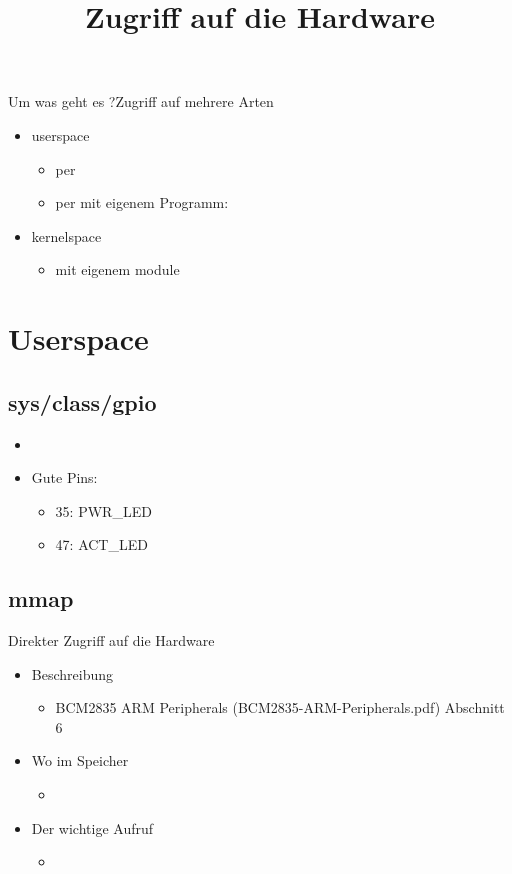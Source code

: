 \documentclass{beamer}
\begin{document}
\newcommand{\qemu}{{\em qemu}\xspace}
\newcommand{\busybox}{{\em busybox}\xspace}
\newcommand{\yocto}{{\em yocto}\xspace}
\title{Zugriff auf die Hardware}

\frame{\titlepage}

\begin{frame}{Um was geht es ?}{Zugriff auf mehrere Arten}
 \begin{itemize}
  \item userspace
  \begin{itemize}
   \item per 
   \item per  mit eigenem Programm: 
  \end{itemize}
  \item kernelspace
  \begin{itemize}
   \item mit eigenem module
  \end{itemize}
 \end{itemize}
\end{frame}

\section{Userspace}
\subsection{sys/class/gpio}
\begin{frame}{}
 \begin{itemize}
  \item {}
  \item Gute Pins:
   \begin{itemize}
    \item 35: PWR\_LED
    \item 47: ACT\_LED
   \end{itemize}
 \end{itemize}
\end{frame}

\subsection{mmap}
\begin{frame}{}{Direkter Zugriff auf die Hardware}
 \begin{itemize}
  \item Beschreibung
   \begin{itemize}
    \item BCM2835 ARM Peripherals (BCM2835-ARM-Peripherals.pdf) Abschnitt 6
   \end{itemize}
  \item Wo im Speicher
   \begin{itemize}
    \item {}
   \end{itemize}
 \item Der wichtige Aufruf
  \begin{itemize}
   \item {}
  \end{itemize}
 \end{itemize}
\end{frame}
\end{document}
